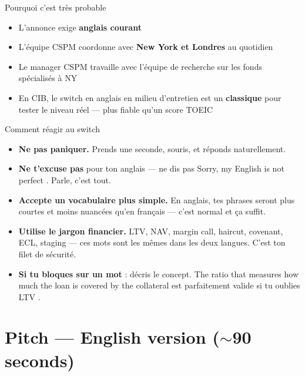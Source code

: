 \documentclass[11pt,a4paper]{article}
\begin{document}
\begin{warnbox}{Pourquoi c'est tr\`es probable}
\begin{itemize}[nosep, leftmargin=12pt]
\item L'annonce exige \textbf{\og anglais courant \fg{}}
\item L'\'equipe CSPM coordonne avec \textbf{New York et Londres} au quotidien
\item Le manager CSPM travaille avec l'\'equipe de recherche sur les fonds sp\'ecialis\'es \`a NY
\item En CIB, le switch en anglais en milieu d'entretien est un \textbf{classique}
      pour tester le niveau r\'eel --- plus fiable qu'un score TOEIC
\end{itemize}
\end{warnbox}

\begin{goodbox}{Comment r\'eagir au switch}
\begin{itemize}[nosep, leftmargin=12pt]
\item \textbf{Ne pas paniquer.} Prends une seconde, souris, et r\'eponds naturellement.
\item \textbf{Ne t'excuse pas} pour ton anglais --- ne dis pas \og Sorry, my English is not perfect \fg{}.
      Parle, c'est tout.
\item \textbf{Accepte un vocabulaire plus simple.} En anglais, tes phrases seront plus courtes
      et moins nuanc\'ees qu'en fran\c{c}ais --- c'est normal et \c{c}a suffit.
\item \textbf{Utilise le jargon financier.} LTV, NAV, margin call, haircut, covenant, ECL, staging
      --- ces mots sont les m\^emes dans les deux langues. C'est ton filet de s\'ecurit\'e.
\item \textbf{Si tu bloques sur un mot} : d\'ecris le concept. \og The ratio that measures how much
      the loan is covered by the collateral \fg{} est parfaitement valide si tu oublies \og LTV \fg{}.
\end{itemize}
\end{goodbox}

\vspace{8pt}

\section{Pitch --- English version ($\sim$90 seconds)}
\end{document}
